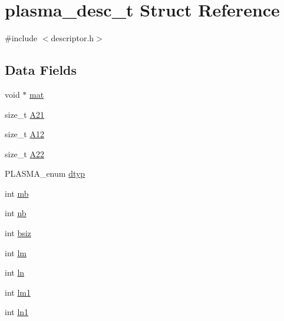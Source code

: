 \hypertarget{structplasma__desc__t}{}\section{plasma\+\_\+desc\+\_\+t Struct Reference}
\label{structplasma__desc__t}


{\ttfamily \#include $<$descriptor.\+h$>$}

\subsection*{Data Fields}
\begin{DoxyCompactItemize}
\item 
void $\ast$ \hyperlink{structplasma__desc__t_abcec2c322f8d2461e8afa6c0e7f52220_abcec2c322f8d2461e8afa6c0e7f52220}{mat}
\item 
size\+\_\+t \hyperlink{structplasma__desc__t_a9749348dffa9c3584312c581f4c2bc20_a9749348dffa9c3584312c581f4c2bc20}{A21}
\item 
size\+\_\+t \hyperlink{structplasma__desc__t_a5081e56a01179e8b9305912676909a13_a5081e56a01179e8b9305912676909a13}{A12}
\item 
size\+\_\+t \hyperlink{structplasma__desc__t_ad8485dcb9895aee64a447c70642cb554_ad8485dcb9895aee64a447c70642cb554}{A22}
\item 
P\+L\+A\+S\+M\+A\+\_\+enum \hyperlink{structplasma__desc__t_ae3456ab5010805f78b76debb9b3ec2b3_ae3456ab5010805f78b76debb9b3ec2b3}{dtyp}
\item 
int \hyperlink{structplasma__desc__t_a8512ed221aec5b7db0e31d02acc5b5c7_a8512ed221aec5b7db0e31d02acc5b5c7}{mb}
\item 
int \hyperlink{structplasma__desc__t_af3770d8c57330e1e22a149f46cddb272_af3770d8c57330e1e22a149f46cddb272}{nb}
\item 
int \hyperlink{structplasma__desc__t_a9611b974738f4accbb79e366fdcba787_a9611b974738f4accbb79e366fdcba787}{bsiz}
\item 
int \hyperlink{structplasma__desc__t_a20df9ed35d79a68537e991794ed16c1f_a20df9ed35d79a68537e991794ed16c1f}{lm}
\item 
int \hyperlink{structplasma__desc__t_a0deb48b03bc6427bdd3770aeea1d5f36_a0deb48b03bc6427bdd3770aeea1d5f36}{ln}
\item 
int \hyperlink{structplasma__desc__t_abcef9d7944f3e6a79a1140389a5c887d_abcef9d7944f3e6a79a1140389a5c887d}{lm1}
\item 
int \hyperlink{structplasma__desc__t_a4e8774165bf4ec4a438b46148bf18c7e_a4e8774165bf4ec4a438b46148bf18c7e}{ln1}

\end{DoxyCompactItemize}

